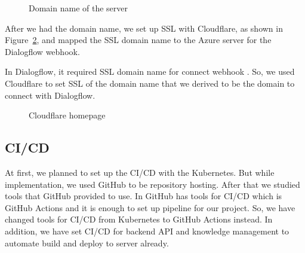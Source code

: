 \documentclass[12pt,oneside,openright,a4paper]{cpe-english-project}
\begin{document}
\begin{figure}[!h]\centering
	\caption{Domain name of the server}\label{fig:Domain name of the server}
\end{figure}

After we had the domain name, we set up SSL with Cloudflare,
as shown in Figure~\ref*{fig:Cloudflare homepage},
and mapped the SSL domain name to the Azure server for the Dialogflow webhook.

In Dialogflow, it required SSL domain name for connect webhook \cite{dialogflow_webhook_requirement}.
So, we used Cloudflare to set SSL of the domain name that we derived
to be the domain to connect with Dialogflow.

\begin{figure}[!h]\centering
	\caption{Cloudflare homepage}\label{fig:Cloudflare homepage}
\end{figure}
\pagebreak

\subsection{CI/CD}
At first, we planned to set up the CI/CD with the Kubernetes.
But while implementation, we used GitHub to be repository hosting.
After that we studied tools that GitHub provided to use.
In GitHub has tools for CI/CD which is GitHub Actions and
it is enough to set up pipeline for our project.
So, we have changed tools for CI/CD from Kubernetes to GitHub Actions instead.
In addition, we have set CI/CD for backend API and knowledge management to
automate build and deploy to server already.
\end{document}
